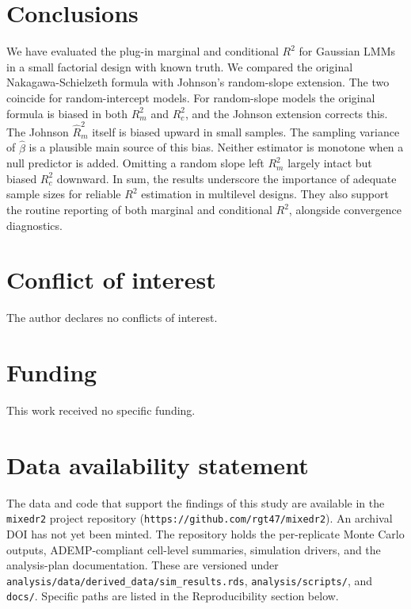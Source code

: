 \documentclass[
  11pt,
]{article}
\begin{document}
\section{Conclusions}\label{conclusions}

We have evaluated the plug-in marginal and conditional \(R^2\) for
Gaussian LMMs in a small factorial design with known truth. We
compared the original Nakagawa-Schielzeth formula with Johnson's
random-slope extension. The two coincide for random-intercept
models. For random-slope models the original formula is biased in
both \(R^2_m\) and \(R^2_c\), and the Johnson extension corrects this.
The Johnson \(\hat R^2_m\) itself is biased upward in small samples.
The sampling variance of \(\hat\beta\) is a plausible main source
of this bias.
Neither estimator is monotone when a null predictor is added.
Omitting a random slope left \(R^2_m\) largely intact but biased
\(R^2_c\) downward. In sum, the results underscore the importance of
adequate sample sizes for reliable \(R^2\) estimation in multilevel
designs. They also support the routine reporting of both marginal
and conditional \(R^2\), alongside convergence diagnostics.

\section{Conflict of interest}\label{conflict-of-interest}

The author declares no conflicts of interest.

\section{Funding}\label{funding}

This work received no specific funding.

\section{Data availability statement}\label{data-availability-statement}

The data and code that support the findings of this study are
available in the \texttt{mixedr2} project repository
(\texttt{https://github.com/rgt47/mixedr2}). An archival DOI has not yet
been minted. The
repository holds the per-replicate Monte Carlo outputs,
ADEMP-compliant cell-level summaries, simulation drivers, and the
analysis-plan documentation. These are versioned under
\texttt{analysis/data/derived\_data/sim\_results.rds},
\texttt{analysis/scripts/}, and \texttt{docs/}. Specific paths are listed in
the Reproducibility section below.
\end{document}
